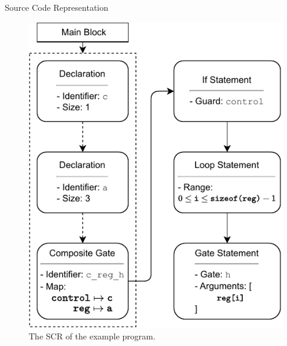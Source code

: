 \begin{frame}{Source Code Representation}
\begin{minipage}{.35\textwidth}
\begin{figure}[htp]
            \includegraphics[]{../figures/drawio/codeGen_sourceCode_example.pdf}
            \caption{The SCR of the example program.}
        \end{figure}
    \end{minipage}
\end{frame}

